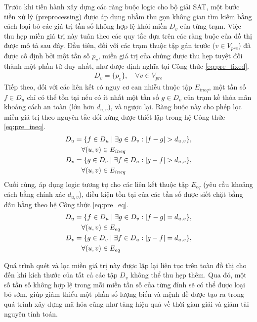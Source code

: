 \documentclass[letterpaper,journal]{IEEEtran}
\begin{document}
Trước khi tiến hành xây dựng các ràng buộc logic cho bộ giải SAT, một bước tiền xử lý (preprocessing) được áp dụng nhằm thu gọn không gian tìm kiếm bằng cách loại bỏ các giá trị tần số không hợp lệ khỏi miền $D_v$ của từng trạm. Việc thu hẹp miền giá trị này tuân theo các quy tắc dựa trên các ràng buộc của đồ thị được mô tả sau đây. Đầu tiên, đối với các trạm thuộc tập gán trước ($v \in V_{pre}$) đã được cố định bởi một tần số $p_v$, miền giá trị của chúng được thu hẹp tuyệt đối thành một phần tử duy nhất, như được định nghĩa tại Công thức \eqref{eq:pre_fixed}.
\begin{align}
    D_v = \{p_v\}, \quad \forall v \in V_{pre} \label{eq:pre_fixed}
\end{align}
Tiếp theo, đối với các liên kết có nguy cơ can nhiễu thuộc tập $E_{ineq}$, một tần số $f \in D_u$ chỉ có thể tồn tại nếu có ít nhất một tần số $g \in D_v$ của trạm kề thỏa mãn khoảng cách an toàn (lớn hơn $d_{u,v}$), và ngược lại. Ràng buộc này cho phép lọc miền giá trị theo nguyên tắc đối xứng được thiết lập trong hệ Công thức \eqref{eq:pre_ineq}.
\begin{align}
    D_u &= \{ f \in D_u \mid \exists g \in D_v : |f - g| > d_{u,v} \}, \notag \\
    &\quad \forall (u,v) \in E_{ineq} \label{eq:pre_ineq} \\
    D_v &= \{ g \in D_v \mid \exists f \in D_u : |g - f| > d_{u,v} \}, \notag \\
    &\quad \forall (u,v) \in E_{ineq} \notag
\end{align}
Cuối cùng, áp dụng logic tương tự cho các liên kết thuộc tập $E_{eq}$ (yêu cầu khoảng cách bằng chính xác $d_{u,v}$), điều kiện tồn tại của các tần số được siết chặt bằng dấu bằng theo hệ Công thức \eqref{eq:pre_eq}.
\begin{align}
    D_u &= \{ f \in D_u \mid \exists g \in D_v : |f - g| = d_{u,v} \}, \notag \\
    &\quad \forall (u,v) \in E_{eq} \label{eq:pre_eq} \\
    D_v &= \{ g \in D_v \mid \exists f \in D_u : |g - f| = d_{u,v} \}, \notag \\
    &\quad \forall (u,v) \in E_{eq} \notag
\end{align}

Quá trình quét và lọc miền giá trị này được lặp lại liên tục trên toàn đồ thị cho đến khi kích thước của tất cả các tập $D_v$ không thể thu hẹp thêm. Qua đó, một số tần số không hợp lệ trong mỗi miền tần số của từng đỉnh sẽ có thể được loại bỏ sớm, giúp giảm thiểu một phần số lượng biến và mệnh đề được tạo ra trong quá trình xây dựng mã hóa cũng như tăng hiệu quả về thời gian giải và giảm tài nguyên tính toán.
\end{document}
